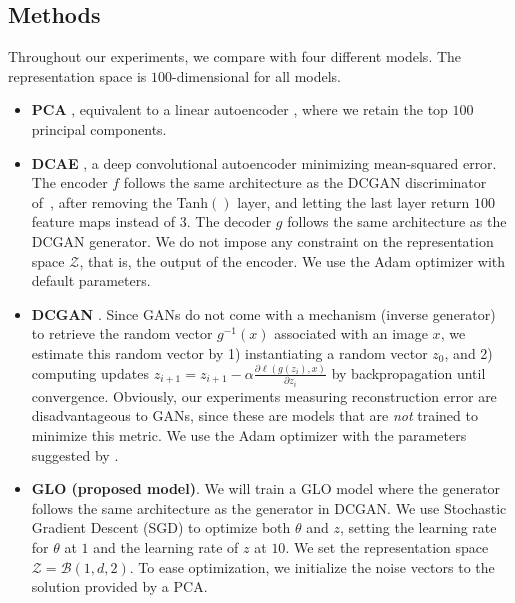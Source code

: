 \documentclass{article}
\newcommand{\GNAT}{GLO}
\begin{document}
\subsection{Methods}\label{sec:experiments:baselines}
    Throughout our experiments, we compare with four different models.
    The representation space is $100$-dimensional for all models.
    \begin{itemize}
        \item \textbf{PCA} \citep{pca_original}, equivalent to a linear
        autoencoder \citep{baldi1989neural}, where we retain the top $100$
        principal components.
        \item \textbf{DCAE} \citep{cae}, a deep convolutional autoencoder
        minimizing mean-squared error. The encoder $f$ follows the same
        architecture as the DCGAN discriminator of~\citet{dcgan}, after
        removing the Tanh$()$ layer, and letting the last layer return $100$
        feature maps instead of $3$. The decoder $g$ follows the same
        architecture as the DCGAN generator. We do not impose any constraint on
        the representation space $\mathcal{Z}$, that is, the output of the
        encoder. We use the Adam optimizer \citep{adam} with default
        parameters.
        \item \textbf{DCGAN} \citep{dcgan}. Since GANs do not come with a
        mechanism (inverse generator) to retrieve the random vector $g^{-1}(x)$
        associated with an image $x$, we
        estimate this random vector by 1) instantiating a random vector $z_0$, and 2)
        computing updates $z_{i+1} = z_{i+1} - \alpha \frac{\partial
        \ell(g(z_i), x)}{\partial z_i}$ by backpropagation until convergence.
        Obviously, our experiments measuring reconstruction error are
        disadvantageous to GANs, since these are models that are \emph{not}
        trained to minimize this metric. We use the Adam optimizer \citep{adam}
        with the parameters suggested by \citep{dcgan}.
        \item \textbf{\GNAT{} (proposed model)}. We will train a \GNAT{} model
        where the generator follows the same architecture as the generator in
        DCGAN. We use Stochastic Gradient Descent (SGD) to optimize both $\theta$
        and $z$, setting the learning rate for $\theta$ at $1$ and the
        learning rate of $z$ at $10$. We set the representation space
        $\mathcal{Z} = \mathcal{B}(1,d,2)$. To
        ease optimization, we initialize the noise vectors to the solution
        provided by a PCA.
    \end{itemize}
\end{document}
